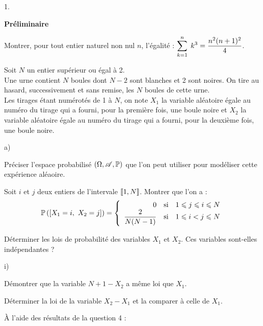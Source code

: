 \documentclass[11pt]{article}%
\begin{document}
\begin{noliste}{1.}
 \setlength{\itemsep}{4mm}
\item \textbf{Préliminaire}

Montrer, pour tout entier naturel non nul $n$, l'égalité : $\displaystyle\sum\limits_{k =
1}^{n}\hspace{.1cm}k^{3} = \dfrac{n^{2}(n + 1)^{2}}{4}$.

\item Soit $N$ un entier supérieur ou égal à 2.\\
Une urne contient $N$ boules dont $N-2$ sont blanches et 2 sont
noires. On
tire au hasard, successivement et sans remise, les $N$ boules de cette
urne.\\
Les tirages étant numérotés de 1 à $N$, on note $X_1$ la variable
aléatoire égale au numéro du tirage qui a fourni, pour la première
fois, une boule
noire et $X_{2}$ la variable aléatoire égale au numéro du tirage qui a
fourni, pour la deuxième fois, une boule noire.

\begin{noliste}{a)}
 \setlength{\itemsep}{2mm}
\item Préciser l'espace probabilisé $(\Omega,\mathscr{A},\mathbb{P})$ que l'on peut
utiliser
pour modéliser cette expérience aléaoire.

\item Soit $i$ et $j$ deux entiers de l'intervale $\llbracket 1,N\rrbracket$. 
Montrer que
l'on
a : 
\[
\mathbb{P}\left(\left[ {X_{1} = i,\ X_{2} = j} \right]\right) = \left\{ 
\begin{array}{rcl}
0 & \text{si} & 1\leqslant j\leqslant i\leqslant N \\
\dfrac{2}{N(N-1)} & \text{si} & 1\leqslant i<j\leqslant N
\end{array}
\right.
\]

\item Déterminer les lois de probabilité des variables $X_{1}$ et
$X_{2}$.
Ces variables sont-elles indépendantes ?

\item 

\begin{nonoliste}{i)}
\item Démontrer que la variable $N + 1-X_{2}$ a même loi que $X_{1}$.

\item Déterminer la loi de la variable $X_{2}-X_{1}$ et la comparer à
celle
de $X_{1}$.
\end{nonoliste}

\item À l'aide des résultats de la question 4 :


\end{noliste}
\end{noliste}
\end{document}
